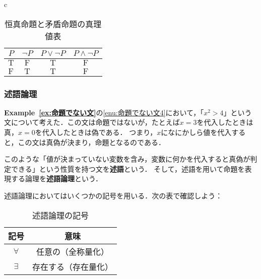 \documentclass[a4paper,11pt]{ltjsarticle}
\renewcommand{\emph}[1]{\textbf{#1}}
\newcommand{\exref}[1]{\textsf{\bfseries Example~\ref{ex:#1}}}
\begin{document}
\begin{table}[htbp]
\begin{center}
\begin{tabular}{c}
      \begin{minipage}{0.3\hsize}
        \begin{center}
          \caption{恒真命題と矛盾命題の真理値表}
          \label{fig:恒真命題と矛盾命題の真理値表}
          \begin{tabular}{|c|c|c|c|} \hline
            $ P$          & $\lnot P$     & $ P \lor \lnot P $ & $P \land \lnot P$ \\ \hline
            $\mathrm{T} $ & $\mathrm{F} $ & $\mathrm{T}$       & $\mathrm{F}$      \\ \hline
            $\mathrm{F} $ & $\mathrm{T}$  & $\mathrm{T}$       & $\mathrm{F}$      \\\hline
          \end{tabular}
        \end{center}
      \end{minipage}
    \end{tabular}
  \end{center}
\end{table}

\subsubsection{述語論理}

\exref{命題でない文}の\ref{enu:命題でない文4}において，「$x^2 >4$」という文について考えた．この文は命題ではないが，たとえば$x=3$を代入したときは真，$x=0$を代入したときは偽である．
つまり，$x$になにかしら値を代入すると，この文は真偽が決まり，命題となるのである．

このような「値が決まっていない変数を含み，変数に何かを代入すると真偽が判定できる」という性質を持つ文を\emph{述語}という．
そして，述語を用いて命題を表現する論理を\emph{述語論理}という．


述語論理においてはいくつかの記号を用いる．次の表で確認しよう：

\begin{table}[ht]
  \centering
  \caption{述語論理の記号}
  \begin{tabular}{c|c}
    \hline
    記号        & 意味                              \\
    \hline
    $\forall$ & 任意の（全称量化\index{ぜんしょうりょうか@全称量化}） \\
    $\exists$ & 存在する（存在量化\index{そんざいりょうか@存在量化}） \\
    \hline
  \end{tabular}
\end{table}
\end{document}
